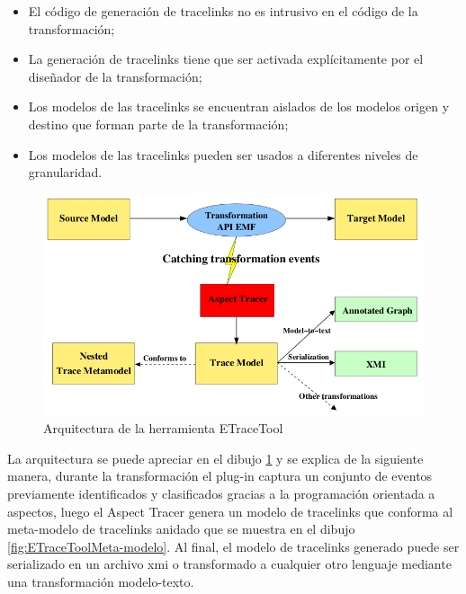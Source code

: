 \documentclass[a4paper,12pt,oneside,spanish]{book}
\begin{document}
\begin{itemize}
\item El código de generación de tracelinks no es intrusivo en el código de la transformación;
\item La generación de tracelinks tiene que ser activada explícitamente por el diseñador de la transformación;
\item Los modelos de las tracelinks se encuentran aislados de los modelos origen y destino que forman parte de la transformación;
\item Los modelos de las tracelinks pueden ser usados a diferentes niveles de granularidad.
\end{itemize}

\begin{figure}[hbtp]
\centering
\includegraphics[scale=0.5]{./img/ETraceTool_Arquitectura}
\caption{Arquitectura de la herramienta ETraceTool}
\label{fig:ArqETraceTool}
\end{figure}

La arquitectura se puede apreciar en el dibujo \ref{fig:ArqETraceTool} y se explica de la siguiente manera, durante la transformación el plug-in captura un conjunto de eventos previamente identificados y clasificados gracias a la programación orientada a aspectos, luego el Aspect Tracer genera un modelo de tracelinks que conforma al meta-modelo de tracelinks anidado que se muestra en el dibujo \ref{fig:ETraceToolMeta-modelo}. Al final, el modelo de tracelinks generado puede ser serializado en un archivo \gls{xmi} o transformado a cualquier otro lenguaje mediante una transformación modelo-texto.
\end{document}
